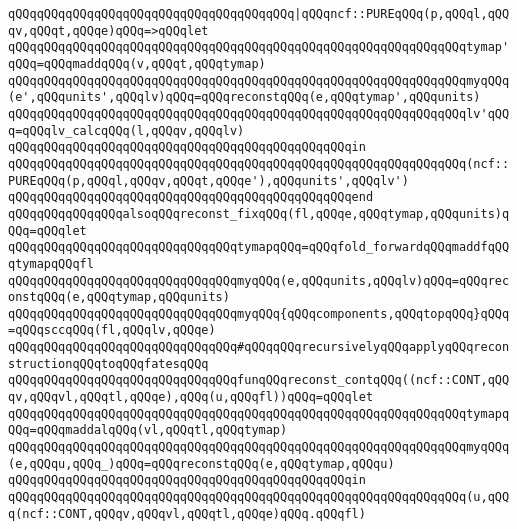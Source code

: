 \verb|qQQqqQQqqQQqqQQqqQQqqQQqqQQqqQQqqQQqqQQq|\verb#|qQQqncf::PUREqQQq(p,qQQql,qQQqv,qQQqt,qQQqe)qQQq=>qQQqlet#\newline
\verb|qQQqqQQqqQQqqQQqqQQqqQQqqQQqqQQqqQQqqQQqqQQqqQQqqQQqqQQqqQQqqQQqtymap'qQQq=qQQqmaddqQQq(v,qQQqt,qQQqtymap)|\newline
\verb|qQQqqQQqqQQqqQQqqQQqqQQqqQQqqQQqqQQqqQQqqQQqqQQqqQQqqQQqqQQqqQQqmyqQQq(e',qQQqunits',qQQqlv)qQQq=qQQqreconstqQQq(e,qQQqtymap',qQQqunits)|\newline
\verb|qQQqqQQqqQQqqQQqqQQqqQQqqQQqqQQqqQQqqQQqqQQqqQQqqQQqqQQqqQQqqQQqlv'qQQq=qQQqlv_calcqQQq(l,qQQqv,qQQqlv)|\newline
\verb|qQQqqQQqqQQqqQQqqQQqqQQqqQQqqQQqqQQqqQQqqQQqqQQqin|\newline
\verb|qQQqqQQqqQQqqQQqqQQqqQQqqQQqqQQqqQQqqQQqqQQqqQQqqQQqqQQqqQQqqQQq(ncf::PUREqQQq(p,qQQql,qQQqv,qQQqt,qQQqe'),qQQqunits',qQQqlv')|\newline
\verb|qQQqqQQqqQQqqQQqqQQqqQQqqQQqqQQqqQQqqQQqqQQqqQQqend|\newline
\newline
\verb|qQQqqQQqqQQqqQQqalsoqQQqreconst_fixqQQq(fl,qQQqe,qQQqtymap,qQQqunits)qQQq=qQQqlet|\newline
\verb|qQQqqQQqqQQqqQQqqQQqqQQqqQQqqQQqtymapqQQq=qQQqfold_forwardqQQqmaddfqQQqtymapqQQqfl|\newline
\verb|qQQqqQQqqQQqqQQqqQQqqQQqqQQqqQQqmyqQQq(e,qQQqunits,qQQqlv)qQQq=qQQqreconstqQQq(e,qQQqtymap,qQQqunits)|\newline
\verb|qQQqqQQqqQQqqQQqqQQqqQQqqQQqqQQqmyqQQq{qQQqcomponents,qQQqtopqQQq}qQQq=qQQqsccqQQq(fl,qQQqlv,qQQqe)|\newline
\newline
\verb|qQQqqQQqqQQqqQQqqQQqqQQqqQQqqQQq#qQQqqQQqrecursivelyqQQqapplyqQQqreconstructionqQQqtoqQQqfatesqQQq|\newline
\verb|qQQqqQQqqQQqqQQqqQQqqQQqqQQqqQQqfunqQQqreconst_contqQQq((ncf::CONT,qQQqv,qQQqvl,qQQqtl,qQQqe),qQQq(u,qQQqfl))qQQq=qQQqlet|\newline
\verb|qQQqqQQqqQQqqQQqqQQqqQQqqQQqqQQqqQQqqQQqqQQqqQQqqQQqqQQqqQQqqQQqtymapqQQq=qQQqmaddalqQQq(vl,qQQqtl,qQQqtymap)|\newline
\verb|qQQqqQQqqQQqqQQqqQQqqQQqqQQqqQQqqQQqqQQqqQQqqQQqqQQqqQQqqQQqqQQqmyqQQq(e,qQQqu,qQQq_)qQQq=qQQqreconstqQQq(e,qQQqtymap,qQQqu)|\newline
\verb|qQQqqQQqqQQqqQQqqQQqqQQqqQQqqQQqqQQqqQQqqQQqqQQqin|\newline
\verb|qQQqqQQqqQQqqQQqqQQqqQQqqQQqqQQqqQQqqQQqqQQqqQQqqQQqqQQqqQQqqQQq(u,qQQq(ncf::CONT,qQQqv,qQQqvl,qQQqtl,qQQqe)qQQq.qQQqfl)|\newline
